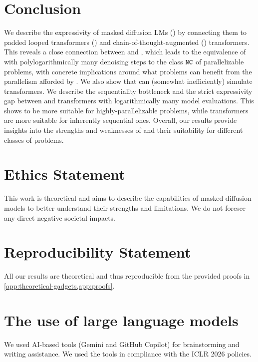 \documentclass{article} %
\begin{document}
\section{Conclusion} \label{sec:conclusion}
We describe the expressivity of masked diffusion LMs (\MDMsAcr) by connecting them to padded looped transformers (\LTsAcr) and chain-of-thought-augmented (\CoTAcr) transformers.
This reveals a close connection between \LTsAcr and \MDMsAcr, which leads to the equivalence of \MDMAcr with polylogarithmically many denoising steps to the class ${{\mathtt{NC}}}$ of parallelizable problems, with concrete implications around what problems can benefit from the parallelism afforded by \MDMsAcr.
We also show that \MDMsAcr can (somewhat inefficiently) simulate \CoTAcr transformers. 
We describe the sequentiality bottleneck and the strict expressivity gap between \MDMsAcr and \CoTAcr transformers with logarithmically many model evaluations.
This shows \MDMsAcr to be more suitable for highly-parallelizable problems, while \CoTAcr transformers are more suitable for inherently sequential ones.
Overall, our results provide insights into the strengths and weaknesses of \MDMsAcr and their suitability for different classes of problems.

\section*{Ethics Statement}
This work is theoretical and aims to describe the capabilities of masked diffusion models to better understand their strengths and limitations. 
We do not foresee any direct negative societal impacts.

\section*{Reproducibility Statement}
All our results are theoretical and thus reproducible from the provided proofs in \cref{app:theoretical-gadgets,app:proofs}.


\section*{The use of large language models} \label{app:llm-use}
We used AI-based tools (Gemini and GitHub Copilot) for brainstorming and writing assistance.
We used the tools in compliance with the ICLR 2026 policies.




\newpage

\end{document}
